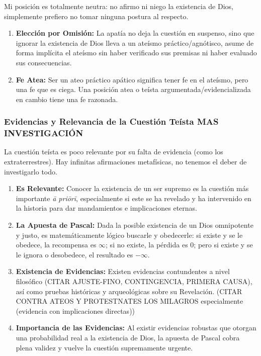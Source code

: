 \documentclass[12pt]{report}
\begin{document}
	\begin{minibloque}[Objeción]
		Mi posición es totalmente neutra: no afirmo ni niego la existencia de Dios, simplemente prefiero no tomar ninguna postura al respecto.
	\end{minibloque}
	\begin{minibloque}[Respuesta]
		\begin{enumerate}
			\item \textbf{Elección por Omisión:} La apatía no deja la cuestión en suspenso, sino que ignorar la existencia de Dios lleva a un ateísmo práctico/agnótisco, asume de forma implícita el ateísmo sin haber verificado sus premisas ni haber evaluado sus consecuencias.
			\item \textbf{Fe Atea:} Ser un ateo práctico apático significa tener fe en el ateísmo, pero una fe que es ciega. Una posición atea o teísta argumentada/evidencializada en cambio tiene una fe razonada.
		\end{enumerate}
	\end{minibloque}
	
	\subsubsection{Evidencias y Relevancia de la Cuestión Teísta MAS INVESTIGACIÓN}
	
	\begin{minibloque}[Objeción]
		La cuestión teísta es poco relevante por su falta de evidencia (como los extraterrestres). Hay infinitas afirmaciones metafísicas, no tenemos el deber de investigarlo todo.
	\end{minibloque}
	\begin{minibloque}[Respuesta]
		\begin{enumerate}
			\item \textbf{Es Relevante:} Conocer la existencia de un ser supremo es la cuestión más importante \textit{ā priōrī}, especialmente si este se ha revelado y ha intervenido en la historia para dar mandamientos e implicaciones eternas.
			\item \textbf{La Apuesta de Pascal:} Dada la posible existencia de un Dios omnipotente y justo, es matemáticamente lógico buscarle y obedecerle: si existe y se le obedece, la recompensa es $\infty$; si no existe, la pérdida es $0$; pero si existe y se le ignora o desobedece, el resultado es $-\infty$.
			\item \textbf{Existencia de Evidencias:} Existen evidencias contundentes a nivel filosófico (CITAR AJUSTE-FINO, CONTINGENCIA, PRIMERA CAUSA), así como pruebas históricas y arqueológicas sobre su Revelación. (CITAR CONTRA ATEOS Y PROTESTNATES LOS MILAGROS especialmente (evidencia con implicaciones directas))
			\item \textbf{Importancia de las Evidencias:} Al existir evidencias robustas que otorgan una probabilidad real a la existencia de Dios, la apuesta de Pascal cobra plena validez y vuelve la cuestión supremamente urgente.
		\end{enumerate}
	\end{minibloque}
\end{document}
